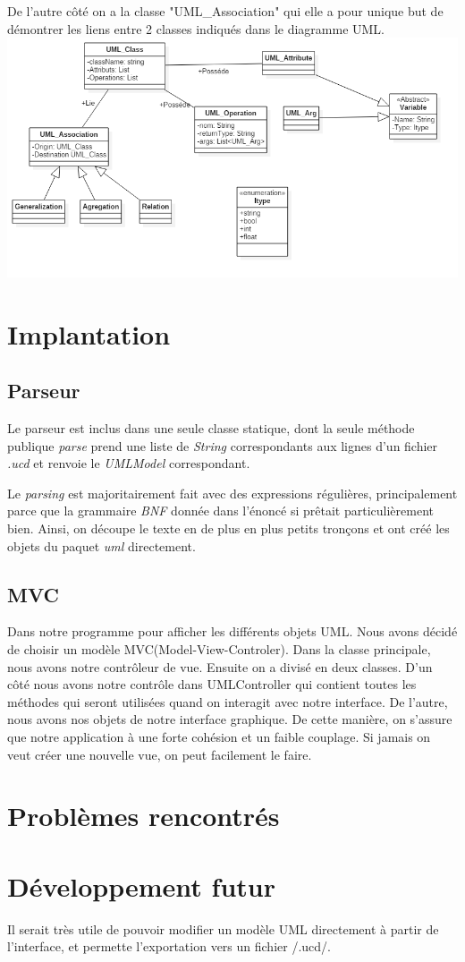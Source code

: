 \documentclass[letter,french]{report}
\begin{document}
	De l'autre côté on a la
	classe "UML\_Association" qui elle a pour unique but de démontrer les liens
	entre 2 classes indiqués dans le diagramme UML.
	\newline
	\includegraphics[scale=.4]{DiagrammeClasse.png}
	
	\section*{Implantation}
	
	\subsection*{Parseur}
	Le parseur est inclus dans une seule classe statique, dont la seule méthode
	publique \emph{parse} prend une liste de \emph{String} correspondants aux lignes d'un
	fichier \emph{.ucd} et renvoie le \emph{UMLModel} correspondant. 
	
	Le \emph{parsing} est majoritairement fait avec des expressions régulières,
	principalement parce que la grammaire \emph{BNF} donnée dans l'énoncé si
	prêtait particulièrement bien. Ainsi, on découpe le texte en de plus en plus
	petits tronçons et ont créé les objets du paquet \emph{uml} directement.
	
	\subsection*{MVC}
	Dans notre programme pour afficher les différents objets UML. Nous avons décidé de choisir un modèle MVC(Model-View-Controler). Dans la classe principale, nous avons notre contrôleur de vue. Ensuite on a divisé en deux classes. D’un côté nous avons notre contrôle dans UMLController qui contient toutes les méthodes qui seront utilisées quand on interagit avec notre interface. De l’autre, nous avons nos objets de notre interface graphique. De cette manière, on s’assure que notre application à une forte cohésion et un faible couplage. Si jamais on veut créer une nouvelle vue, on peut facilement le faire.
	
	
	
	
	
	\section*{Problèmes rencontrés}
	
	
	
	
	\section*{Développement futur}
	Il serait très utile de pouvoir modifier un modèle UML directement à partir de l'interface,
	et permette l'exportation vers un fichier /.ucd/.
	
	
	
	
\end{document}
